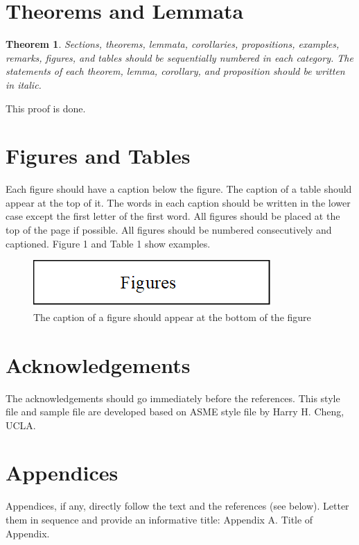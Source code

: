 \documentclass{ICLSarticle}
\newtheorem{theorem}{Theorem}
\renewenvironment{proof}{{\noindent\bfseries Proof.}}{}
\begin{document}
\section{Theorems and Lemmata}

\begin{theorem}
Sections, theorems, lemmata, corollaries, propositions, examples, remarks, figures, and tables should be sequentially numbered in each category. The statements of each theorem, lemma, corollary, and proposition should be written in italic.
\end{theorem}

\begin{proof}
This proof is done.
\end{proof}

\section{Figures and Tables}
Each figure should have a caption below the figure. The caption of a table should appear at the top of it. The words in each caption should be written in the lower case except the first letter of the first word. All figures should be placed at the top of the page if possible. All figures should be numbered consecutively and captioned. Figure 1 and Table 1 show examples.

\begin{figure}[H]
\centering
\includegraphics[width=.5\columnwidth]{figure}
\caption{The caption of a figure should appear at the bottom of the figure}
\end{figure}
\section*{Acknowledgements}
The acknowledgements should go immediately before the references. This style file and sample file are developed based on ASME style file by Harry H. Cheng, UCLA.


\appendix
\section*{Appendices}
Appendices, if any, directly follow the text and the references (see below). Letter them in sequence and provide an informative title: Appendix A. Title of Appendix. 
\end{document}
